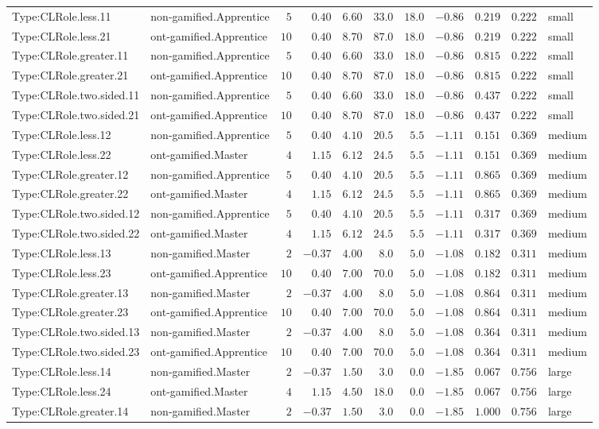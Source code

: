 \documentclass[6pt,a4paper]{article}
\begin{document}
{\begin{longtable}{llrrrrrrrrl}
Type:CLRole.less.11&non-gamified.Apprentice&$ 5$&$ 0.40$&$ 6.60$&$ 33.0$&$18.0$&$-0.86$&$0.219$&$0.222$&small\tabularnewline
Type:CLRole.less.21&ont-gamified.Apprentice&$10$&$ 0.40$&$ 8.70$&$ 87.0$&$18.0$&$-0.86$&$0.219$&$0.222$&small\tabularnewline
Type:CLRole.greater.11&non-gamified.Apprentice&$ 5$&$ 0.40$&$ 6.60$&$ 33.0$&$18.0$&$-0.86$&$0.815$&$0.222$&small\tabularnewline
Type:CLRole.greater.21&ont-gamified.Apprentice&$10$&$ 0.40$&$ 8.70$&$ 87.0$&$18.0$&$-0.86$&$0.815$&$0.222$&small\tabularnewline
Type:CLRole.two.sided.11&non-gamified.Apprentice&$ 5$&$ 0.40$&$ 6.60$&$ 33.0$&$18.0$&$-0.86$&$0.437$&$0.222$&small\tabularnewline
Type:CLRole.two.sided.21&ont-gamified.Apprentice&$10$&$ 0.40$&$ 8.70$&$ 87.0$&$18.0$&$-0.86$&$0.437$&$0.222$&small\tabularnewline
Type:CLRole.less.12&non-gamified.Apprentice&$ 5$&$ 0.40$&$ 4.10$&$ 20.5$&$ 5.5$&$-1.11$&$0.151$&$0.369$&medium\tabularnewline
Type:CLRole.less.22&ont-gamified.Master&$ 4$&$ 1.15$&$ 6.12$&$ 24.5$&$ 5.5$&$-1.11$&$0.151$&$0.369$&medium\tabularnewline
Type:CLRole.greater.12&non-gamified.Apprentice&$ 5$&$ 0.40$&$ 4.10$&$ 20.5$&$ 5.5$&$-1.11$&$0.865$&$0.369$&medium\tabularnewline
Type:CLRole.greater.22&ont-gamified.Master&$ 4$&$ 1.15$&$ 6.12$&$ 24.5$&$ 5.5$&$-1.11$&$0.865$&$0.369$&medium\tabularnewline
Type:CLRole.two.sided.12&non-gamified.Apprentice&$ 5$&$ 0.40$&$ 4.10$&$ 20.5$&$ 5.5$&$-1.11$&$0.317$&$0.369$&medium\tabularnewline
Type:CLRole.two.sided.22&ont-gamified.Master&$ 4$&$ 1.15$&$ 6.12$&$ 24.5$&$ 5.5$&$-1.11$&$0.317$&$0.369$&medium\tabularnewline
Type:CLRole.less.13&non-gamified.Master&$ 2$&$-0.37$&$ 4.00$&$  8.0$&$ 5.0$&$-1.08$&$0.182$&$0.311$&medium\tabularnewline
Type:CLRole.less.23&ont-gamified.Apprentice&$10$&$ 0.40$&$ 7.00$&$ 70.0$&$ 5.0$&$-1.08$&$0.182$&$0.311$&medium\tabularnewline
Type:CLRole.greater.13&non-gamified.Master&$ 2$&$-0.37$&$ 4.00$&$  8.0$&$ 5.0$&$-1.08$&$0.864$&$0.311$&medium\tabularnewline
Type:CLRole.greater.23&ont-gamified.Apprentice&$10$&$ 0.40$&$ 7.00$&$ 70.0$&$ 5.0$&$-1.08$&$0.864$&$0.311$&medium\tabularnewline
Type:CLRole.two.sided.13&non-gamified.Master&$ 2$&$-0.37$&$ 4.00$&$  8.0$&$ 5.0$&$-1.08$&$0.364$&$0.311$&medium\tabularnewline
Type:CLRole.two.sided.23&ont-gamified.Apprentice&$10$&$ 0.40$&$ 7.00$&$ 70.0$&$ 5.0$&$-1.08$&$0.364$&$0.311$&medium\tabularnewline
Type:CLRole.less.14&non-gamified.Master&$ 2$&$-0.37$&$ 1.50$&$  3.0$&$ 0.0$&$-1.85$&$0.067$&$0.756$&large\tabularnewline
Type:CLRole.less.24&ont-gamified.Master&$ 4$&$ 1.15$&$ 4.50$&$ 18.0$&$ 0.0$&$-1.85$&$0.067$&$0.756$&large\tabularnewline
Type:CLRole.greater.14&non-gamified.Master&$ 2$&$-0.37$&$ 1.50$&$  3.0$&$ 0.0$&$-1.85$&$1.000$&$0.756$&large\tabularnewline

\end{longtable}}
\end{document}
